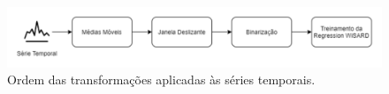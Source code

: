 \begin{figure}[!ht]
    \centering
    \includegraphics[width=5.0in]{img/transforms_order.pdf}
    \caption{Ordem das transformações aplicadas às séries temporais.}
    \label{fig:transforms_order}
\end{figure}

